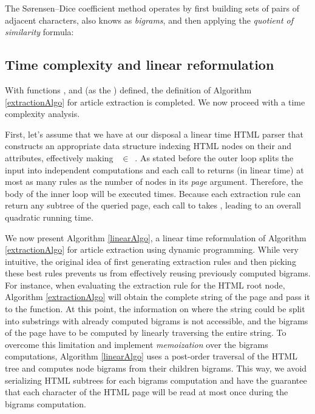 \similarityTable

The Sørensen–Dice coefficient method operates by first building sets of pairs of adjacent characters, also knows as \emph{bigrams}, and then applying the \emph{quotient of similarity} formula:

\similarityAlgo


\subsection{Time complexity and linear reformulation}
\label{timecomplexityandlinearreformulation}

With functions ,  and  (as the ) defined, the definition of Algorithm \ref{extractionAlgo} for article extraction is completed. We now proceed with a time complexity analysis.

First, let's assume that we have at our disposal a linear time HTML parser that constructs an appropriate data structure indexing HTML nodes on their  and  attributes, effectively making ~$\in$~. As stated before the outer loop splits the input into independent computations and each call to  returns (in linear time) at most as many rules as the number of nodes in its \emph{page} argument. Therefore, the body of the inner loop will be executed  times. Because each extraction rule can return any subtree of the queried page, each call to  takes , leading to an overall quadratic running time.

We now present Algorithm \ref{linearAlgo}, a linear time reformulation of Algorithm \ref{extractionAlgo} for article extraction using dynamic programming. While very intuitive, the original idea of first generating extraction rules and then picking these best rules prevents us from effectively reusing previously computed bigrams. For instance, when evaluating the extraction rule for the HTML root node, Algorithm \ref{extractionAlgo} will obtain the complete string of the page and pass it to the  function. At this point, the information on where the string could be split into substrings with already computed bigrams is not accessible, and the bigrams of the page have to be computed by linearly traversing the entire string. To overcome this limitation and implement \emph{memoization} over the bigrams computations, Algorithm \ref{linearAlgo} uses a post-order traversal of the HTML tree and computes node bigrams from their children bigrams. This way, we avoid serializing HTML subtrees for each bigrams computation and have the guarantee that each character of the HTML page will be read at most once during the bigrams computation.


